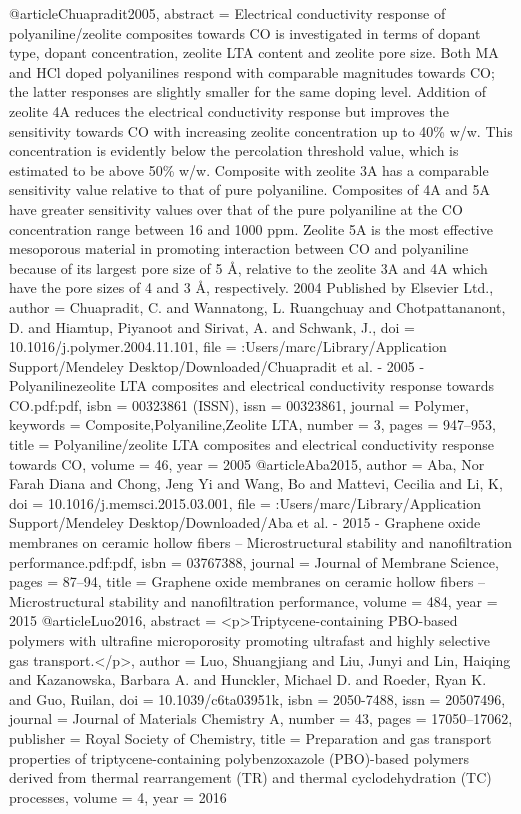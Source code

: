 @article{Chuapradit2005,
abstract = {Electrical conductivity response of polyaniline/zeolite composites towards CO is investigated in terms of dopant type, dopant concentration, zeolite LTA content and zeolite pore size. Both MA and HCl doped polyanilines respond with comparable magnitudes towards CO; the latter responses are slightly smaller for the same doping level. Addition of zeolite 4A reduces the electrical conductivity response but improves the sensitivity towards CO with increasing zeolite concentration up to 40{\%} w/w. This concentration is evidently below the percolation threshold value, which is estimated to be above 50{\%} w/w. Composite with zeolite 3A has a comparable sensitivity value relative to that of pure polyaniline. Composites of 4A and 5A have greater sensitivity values over that of the pure polyaniline at the CO concentration range between 16 and 1000 ppm. Zeolite 5A is the most effective mesoporous material in promoting interaction between CO and polyaniline because of its largest pore size of 5 {\AA}, relative to the zeolite 3A and 4A which have the pore sizes of 4 and 3 {\AA}, respectively. {\textcopyright} 2004 Published by Elsevier Ltd.},
author = {Chuapradit, C. and Wannatong, L. Ruangchuay and Chotpattananont, D. and Hiamtup, Piyanoot and Sirivat, A. and Schwank, J.},
doi = {10.1016/j.polymer.2004.11.101},
file = {:Users/marc/Library/Application Support/Mendeley Desktop/Downloaded/Chuapradit et al. - 2005 - Polyanilinezeolite LTA composites and electrical conductivity response towards CO.pdf:pdf},
isbn = {00323861 (ISSN)},
issn = {00323861},
journal = {Polymer},
keywords = {Composite,Polyaniline,Zeolite LTA},
number = {3},
pages = {947--953},
title = {{Polyaniline/zeolite LTA composites and electrical conductivity response towards CO}},
volume = {46},
year = {2005}
}
@article{Aba2015,
author = {Aba, Nor Farah Diana and Chong, Jeng Yi and Wang, Bo and Mattevi, Cecilia and Li, K},
doi = {10.1016/j.memsci.2015.03.001},
file = {:Users/marc/Library/Application Support/Mendeley Desktop/Downloaded/Aba et al. - 2015 - Graphene oxide membranes on ceramic hollow fibers – Microstructural stability and nanofiltration performance.pdf:pdf},
isbn = {03767388},
journal = {Journal of Membrane Science},
pages = {87--94},
title = {{Graphene oxide membranes on ceramic hollow fibers – Microstructural stability and nanofiltration performance}},
volume = {484},
year = {2015}
}
@article{Luo2016,
abstract = {{\textless}p{\textgreater}Triptycene-containing PBO-based polymers with ultrafine microporosity promoting ultrafast and highly selective gas transport.{\textless}/p{\textgreater}},
author = {Luo, Shuangjiang and Liu, Junyi and Lin, Haiqing and Kazanowska, Barbara A. and Hunckler, Michael D. and Roeder, Ryan K. and Guo, Ruilan},
doi = {10.1039/c6ta03951k},
isbn = {2050-7488},
issn = {20507496},
journal = {Journal of Materials Chemistry A},
number = {43},
pages = {17050--17062},
publisher = {Royal Society of Chemistry},
title = {{Preparation and gas transport properties of triptycene-containing polybenzoxazole (PBO)-based polymers derived from thermal rearrangement (TR) and thermal cyclodehydration (TC) processes}},
volume = {4},
year = {2016}
}
